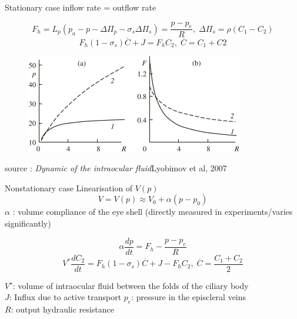 \begin{frame}{Stationary case}
 inflow rate = outflow rate
\begin{block}{}
\[
F_h = L_p \left(p_a-p-\Delta \Pi_p - \sigma_s \Delta\Pi_s\right) = \frac{p - p_e}{R}, \; \Delta \Pi_s = \rho(C_1-C_2)
\]
\[
F_h (1 - \sigma_s) \overline{C} + J = F_hC_2 , \; \overline{C}= C_1+C2
\]

\end{block}
\begin{figure}[H]
\includegraphics[scale=1]{images/courbes_pr_fr}
\end{figure}
\tiny{source : \textit{Dynamic of the intraocular fluid}Lyobimov et al, 2007}
\end{frame}

\begin{frame}{Nonstationary case}
Linearisation of $V(p)$
\[
V = V(p) \approx V_0 + \alpha (p-p_0)
\]
$\alpha$ : volume compliance of the eye shell (directly measured in experiments/varies significantly)

\begin{block}{}
\[
 \alpha \frac{dp}{dt}=F_{h}-\frac{p-p_e}{R}
 \]
\[
 V^{\ast} \frac{dC_{2}}{dt}= F_h(1-\sigma_s)\overline{C} + J - F_hC_2,\; \overline{C}= \frac{C_1+C_2}{2}
 \]
\end{block}

$V^\star$: volume of intraocular fluid between the folds of the ciliary body\\
$J$: Influx due to active transport
$p_e$: pressure in the episcleral veins\\
$R$: output hydraulic resistance\\

\end{frame}

